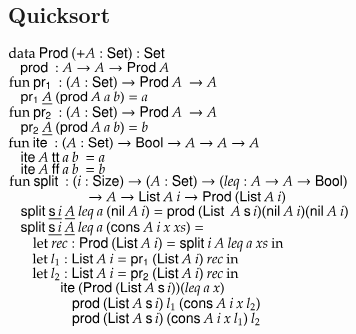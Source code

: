\subsection{Quicksort}
\begin{bsp}
$\mathrm{data}\: \mathsf{Prod}\: ( + A : \mathsf{Set}) : \mathsf{Set}$\\
$\hspace*{3mm}  \mathsf{prod}\: : A \rightarrow A \rightarrow \mathsf{Prod}\: A$\\

$\mathrm{fun}\: \mathsf{pr_1}\: : ( A : \mathsf{Set} ) \rightarrow \mathsf{Prod}\: A\: \rightarrow A$\\
$\hspace*{3mm} \mathsf{pr_1}\: \underline{A}\: (\mathsf{prod}\: A\: a \: b) = a$\\

$\mathrm{fun}\: \mathsf{pr_2}\: : ( A : \mathsf{Set} ) \rightarrow \mathsf{Prod}\: A\: \rightarrow A$\\
$\hspace*{3mm} \mathsf{pr_2}\: \underline{A}\: (\mathsf{prod}\: A\: a \: b) = b$\\

$\mathrm{fun}\: \mathsf{ite}\: : (A : \mathsf{Set} ) \rightarrow \mathsf{Bool} \rightarrow A \rightarrow A \rightarrow A$\\
$\hspace*{3mm} \mathsf{ite}\: A\: \mathsf{tt}\: a\: b\: = a$\\
$\hspace*{3mm} \mathsf{ite}\: A\: \mathsf{ff}\: a\: b\: = b$\\

$\mathrm{fun}\: \mathsf{split}\: : (i : \mathsf{Size} ) \rightarrow (A : \mathsf{Set} ) \rightarrow ( leq : A \rightarrow A \rightarrow \mathsf{Bool} ) $\\
$\spcx	\spcx \ra A \ra \List A \: i \ra \ProdT (\List A \: i)$\\
$\hspace*{3mm} \mathsf{split}\: \underline{\mathsf{s}\, i} \: \underline{A} \: leq \: a \: (\mathsf{nil}\: A \: i) = \mathsf{prod}\: (\mathsf{List}\: \: A \: \mathsf{s}\, i) (\mathsf{nil}\: A \: i) (\mathsf{nil}\: A \: i)$\\
$\hspace*{3mm} \mathsf{split}\: \underline{\mathsf{s}\, i} \: \underline{A} \: leq \: a \: (\mathsf{cons}\: A \: i \: x \:xs) = $\\ 
$\spc \spc \ELet{rec}{\ProdT (\List A \:i)}{\pivot i \: A \: leq \: a \: xs}$\\
$\spc \spc \ELet{l_1}{\List A \:i}{\pra (\List A \: i) \: rec}$\\
$\spc \spc \ELet{l_2}{\List A \:i}{\prb (\List A \: i) \: rec}$\\  
$\spc \spcx  \ite (\ProdT (\List A \: \s i)) (leq \: a \: x)  $\\
$\spc \spcx  \spc \prd (\List A \: \s i) \: l_1 \: (\cons A \: i \: x \: l_2)$\\
$\spc \spcx  \spc \prd (\List A \: \s i) \: (\cons A \: i \: x \: l_1) \: l_2$\\


\end{bsp}

